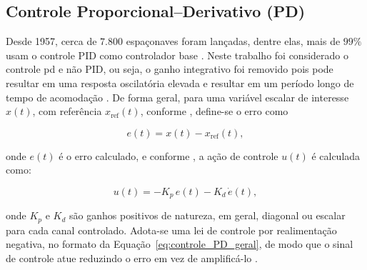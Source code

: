 


\subsection{Controle Proporcional--Derivativo (PD)}
\label{sec:controle_PD}

Desde 1957, cerca de $7.800$ espaçonaves foram lançadas, dentre elas, mais de $99\%$ usam o controle PID como controlador base \cite{xie2016applications}.
Neste trabalho foi considerado o controle \gls{pd} e não PID, ou seja, o ganho integrativo foi removido pois pode resultar em uma resposta oscilatória elevada e resultar em um período longo de tempo de acomodação \cite{razak2007industrial}.
De forma geral, para uma variável escalar de interesse $x(t)$, com referência $x_{\text{ref}}(t)$, conforme \cite{astrom1995pid}, define-se o erro como 

\begin{equation}
e(t) = x(t) - x_{\text{ref}}(t),
\end{equation}

onde $e(t)$ é o erro calculado, e conforme \cite{xue2007linear}, a ação de controle $u(t)$ é calculada como:

\begin{equation}
u(t) = -K_p\,e(t) - K_d\,\dot e(t),
\label{eq:controle_PD_geral}
\end{equation}

onde $K_p$ e $K_d$ são ganhos positivos de natureza, em geral, diagonal ou escalar para cada canal controlado.
Adota-se uma lei de controle por realimentação negativa, no formato da Equação~\eqref{eq:controle_PD_geral}, de modo que o sinal de controle atue reduzindo o erro em vez de amplificá-lo \cite{ogata2010engenharia}.






